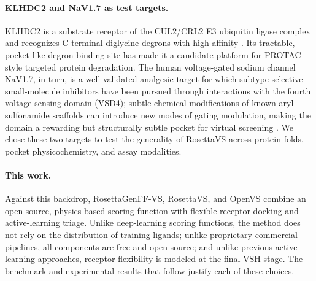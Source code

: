\paragraph{KLHDC2 and NaV1.7 as test targets.}
KLHDC2 is a substrate receptor of the CUL2/CRL2 E3 ubiquitin ligase complex
and recognizes C-terminal diglycine degrons with high affinity
\citep{slusarz2023klhdc3}. Its tractable, pocket-like degron-binding site
has made it a candidate platform for PROTAC-style targeted protein
degradation. The human voltage-gated sodium channel NaV1.7, in turn, is a
well-validated analgesic target for which subtype-selective small-molecule
inhibitors have been pursued through interactions with the fourth
voltage-sensing domain (VSD4); subtle chemical modifications of known aryl
sulfonamide scaffolds can introduce new modes of gating modulation, making
the domain a rewarding but structurally subtle pocket for virtual screening
\citep{wang2015nav17methyl}. We chose these two targets to test the
generality of RosettaVS across protein folds, pocket physicochemistry, and
assay modalities.

\paragraph{This work.}
Against this backdrop, RosettaGenFF-VS, RosettaVS, and OpenVS combine an
open-source, physics-based scoring function with flexible-receptor docking
and active-learning triage. Unlike deep-learning scoring functions, the
method does not rely on the distribution of training ligands; unlike
proprietary commercial pipelines, all components are free and open-source;
and unlike previous active-learning approaches, receptor flexibility is
modeled at the final VSH stage. The benchmark and experimental results that
follow justify each of these choices.
